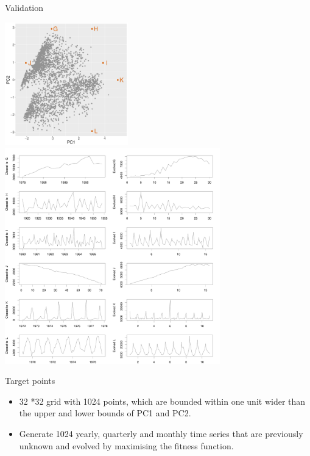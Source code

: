 \documentclass[12pt,ignorenonframetext,compress]{beamer}
\begin{document}
\begin{frame}{Validation}

\includegraphics[width=0.4\textwidth]{figures/UnknownEvolvedEgsLocations.pdf}
\includegraphics[width=0.7\textwidth]{figures/UnknownEvolvedEgs.pdf}

\end{frame}

\begin{frame}{Target points}

\begin{itemize}
\item
  32 *32 grid with 1024 points, which are bounded within one unit wider
  than the upper and lower bounds of PC1 and PC2.
\item
  Generate 1024 yearly, quarterly and monthly time series that are
  previously unknown and evolved by maximising the fitness function.
\end{itemize}

\end{frame}
\end{document}
